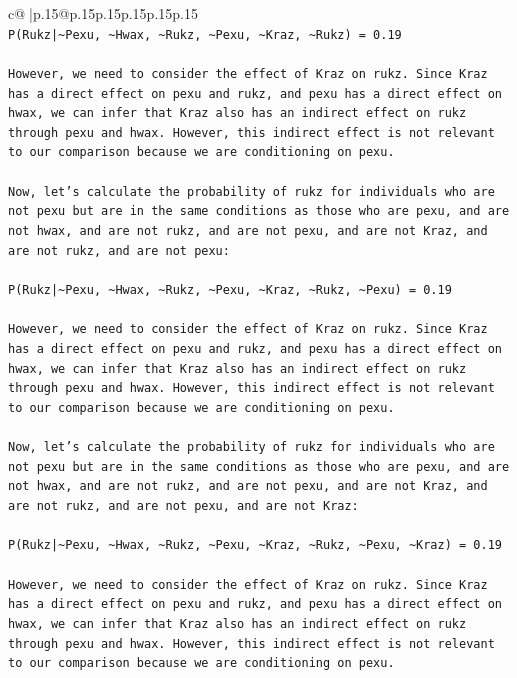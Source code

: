 \documentclass{article}
\begin{document}
{\begin{supertabular}{c@{$\;$}|p{.15\linewidth}@{}p{.15\linewidth}p{.15\linewidth}p{.15\linewidth}p{.15\linewidth}p{.15\linewidth}}
{{{\\ 
\texttt{P(Rukz|\textasciitilde{}Pexu, \textasciitilde{}Hwax, \textasciitilde{}Rukz, \textasciitilde{}Pexu, \textasciitilde{}Kraz, \textasciitilde{}Rukz) = 0.19} \\
\\ 
\texttt{However, we need to consider the effect of Kraz on rukz. Since Kraz has a direct effect on pexu and rukz, and pexu has a direct effect on hwax, we can infer that Kraz also has an indirect effect on rukz through pexu and hwax. However, this indirect effect is not relevant to our comparison because we are conditioning on pexu.} \\
\\ 
\texttt{Now, let's calculate the probability of rukz for individuals who are not pexu but are in the same conditions as those who are pexu, and are not hwax, and are not rukz, and are not pexu, and are not Kraz, and are not rukz, and are not pexu:} \\
\\ 
\texttt{P(Rukz|\textasciitilde{}Pexu, \textasciitilde{}Hwax, \textasciitilde{}Rukz, \textasciitilde{}Pexu, \textasciitilde{}Kraz, \textasciitilde{}Rukz, \textasciitilde{}Pexu) = 0.19} \\
\\ 
\texttt{However, we need to consider the effect of Kraz on rukz. Since Kraz has a direct effect on pexu and rukz, and pexu has a direct effect on hwax, we can infer that Kraz also has an indirect effect on rukz through pexu and hwax. However, this indirect effect is not relevant to our comparison because we are conditioning on pexu.} \\
\\ 
\texttt{Now, let's calculate the probability of rukz for individuals who are not pexu but are in the same conditions as those who are pexu, and are not hwax, and are not rukz, and are not pexu, and are not Kraz, and are not rukz, and are not pexu, and are not Kraz:} \\
\\ 
\texttt{P(Rukz|\textasciitilde{}Pexu, \textasciitilde{}Hwax, \textasciitilde{}Rukz, \textasciitilde{}Pexu, \textasciitilde{}Kraz, \textasciitilde{}Rukz, \textasciitilde{}Pexu, \textasciitilde{}Kraz) = 0.19} \\
\\ 
\texttt{However, we need to consider the effect of Kraz on rukz. Since Kraz has a direct effect on pexu and rukz, and pexu has a direct effect on hwax, we can infer that Kraz also has an indirect effect on rukz through pexu and hwax. However, this indirect effect is not relevant to our comparison because we are conditioning on pexu.} \\
}}}
\end{supertabular}}
\end{document}
